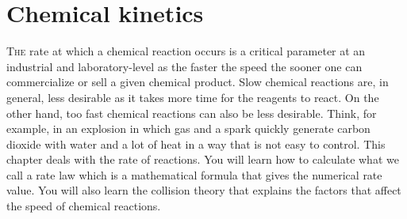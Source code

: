 \documentclass[main.tex]{subfiles}
\begin{document}
  
 \setcounter{chapter}{2}\chapter[Chemical kinetics]{Chemical kinetics}

%


\lettrine[lines=4]{\color{black!45}T}{he} rate at which a chemical reaction occurs is a critical parameter at an industrial and laboratory-level as the faster the speed the sooner one can commercialize or sell a given chemical product. Slow chemical reactions are, in general, less desirable as it takes more time for the reagents to react. On the other hand, too fast chemical reactions can also be less desirable. Think, for example, in an explosion in which gas and a spark quickly generate carbon dioxide with water and a lot of heat in a way that is not easy to control. This chapter deals with the rate of reactions. You will learn how to calculate what we call a rate law which is a mathematical formula that gives the numerical rate value. You will also learn the collision theory that explains the factors that affect the speed of chemical reactions. 
\end{document}
